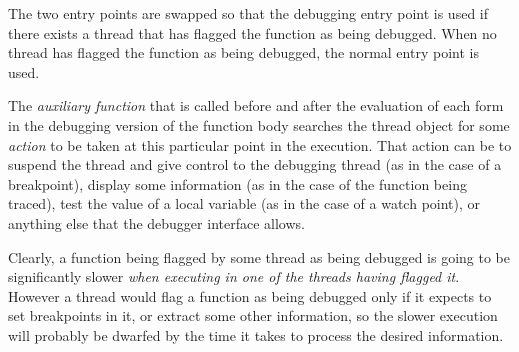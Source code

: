 The two entry points are swapped so that the debugging entry point is
used if there exists a thread that has flagged the function as being
debugged.  When no thread has flagged the function as being debugged,
the normal entry point is used.

The \emph{auxiliary function} that is called before and after the
evaluation of each form in the debugging version of the function body
searches the thread object for some \emph{action} to be taken at this
particular point in the execution.  That action can be to suspend the
thread and give control to the debugging thread (as in the case of a
breakpoint), display some information (as in the case of the function
being traced), test the value of a local variable (as in the case of a
watch point), or anything else that the debugger interface allows.

Clearly, a function being flagged by some thread as being debugged is
going to be significantly slower \emph{when executing in one of the
  threads having flagged it}.  However a thread would flag a function
as being debugged only if it expects to set breakpoints in it, or
extract some other information, so the slower execution will probably
be dwarfed by the time it takes to process the desired information.



